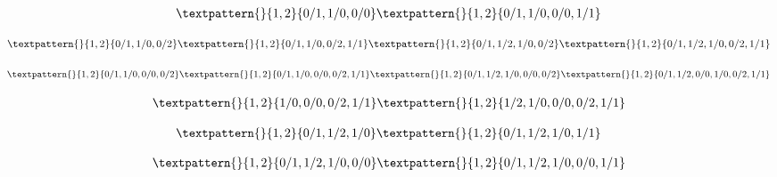 \begin{equation}
	\begin{gathered}
		\textpattern{}{1,2}{0/1,1/0,0/0}
		\textpattern{}{1,2}{0/1,1/0,0/0,1/1}
	\end{gathered}
	\label{cls:3}
\end{equation}

\begin{equation}
	\begin{gathered}
		\textpattern{}{1,2}{0/1,1/0,0/2}
		\textpattern{}{1,2}{0/1,1/0,0/2,1/1}
		\textpattern{}{1,2}{0/1,1/2,1/0,0/2}
		\textpattern{}{1,2}{0/1,1/2,1/0,0/2,1/1}
	\end{gathered}
	\label{cls:4}
\end{equation}

\begin{equation}
	\begin{gathered}
		\textpattern{}{1,2}{0/1,1/0,0/0,0/2}
		\textpattern{}{1,2}{0/1,1/0,0/0,0/2,1/1}
		\textpattern{}{1,2}{0/1,1/2,1/0,0/0,0/2}
		\textpattern{}{1,2}{0/1,1/2,0/0,1/0,0/2,1/1}
	\end{gathered}
	\label{cls:5}
\end{equation}

\begin{equation}
	\begin{gathered}
		\textpattern{}{1,2}{1/0,0/0,0/2,1/1}
		\textpattern{}{1,2}{1/2,1/0,0/0,0/2,1/1}
	\end{gathered}
	\label{cls:6}
\end{equation}

\begin{equation}
	\begin{gathered}
		\textpattern{}{1,2}{0/1,1/2,1/0}
		\textpattern{}{1,2}{0/1,1/2,1/0,1/1}
	\end{gathered}
	\label{cls:7}
\end{equation}

\begin{equation}
	\begin{gathered}
		\textpattern{}{1,2}{0/1,1/2,1/0,0/0}
		\textpattern{}{1,2}{0/1,1/2,1/0,0/0,1/1}
	\end{gathered}
	\label{cls:8}
\end{equation}

